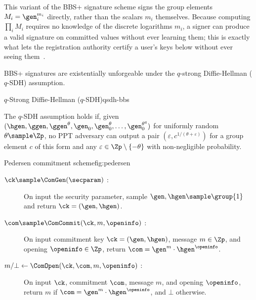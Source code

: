 This variant of the BBS+ signature scheme signs the group elements $M_i =
\gen_i^{m_i}$ directly, rather than the scalars $m_i$ themselves. Because
computing $\prod_i M_i$ requires no knowledge of the discrete logarithms $m_i$,
a signer can produce a valid signature on committed values without ever
learning them; this is exactly what lets the registration authority certify a
user's keys below without ever seeing them~\cite{SCN:AuSusMu06,EC:TesZhu23b}.

BBS+ signatures are existentially unforgeable under the $q$-strong
Diffie-Hellman ($q$-SDH) assumption.

\begin{assumptionbox}{$q$-Strong Diffie-Hellman ($q$-SDH)}{qsdh-bbs}

  The $q$-SDH assumption holds if, given $(\hgen, \ggen, \ggen^{\theta},
  \gen_0, \gen_0^{\theta}, \ldots, \gen_0^{\theta^{q}})$ for uniformly random
  $\theta \sample \Zp$, no PPT adversary can output a pair $(\varepsilon,
  c^{1/(\theta+\varepsilon)})$ for a group element $c$ of this form and any
  $\varepsilon \in \Zp \setminus \{-\theta\}$ with non-negligible probability.

\end{assumptionbox}

\begin{primitivebox}{Pedersen commitment scheme}{fig:pedersen}

  \begin{description}

    \item[$\ck \sample \ComGen(\secparam)$ :] On input the security parameter,
      sample $\gen,\hgen \sample \group{1}$ and return $\ck = (\gen,\hgen)$.

    \item[$\com \sample \ComCommit(\ck,m,\openinfo)$ :] On input commitment key
      $\ck = (\gen,\hgen)$, message $m \in \Zp$, and opening $\openinfo \in
      \Zp$, return $\com = \gen^{m} \cdot \hgen^{\openinfo}$.

    \item[$m/\bot \leftarrow \ComOpen(\ck,\com,m,\openinfo)$ :] On input $\ck$,
      commitment $\com$, message $m$, and opening $\openinfo$, return $m$ if
      $\com = \gen^{m}\cdot\hgen^{\openinfo}$, and $\bot$ otherwise.

  \end{description}

\end{primitivebox}

